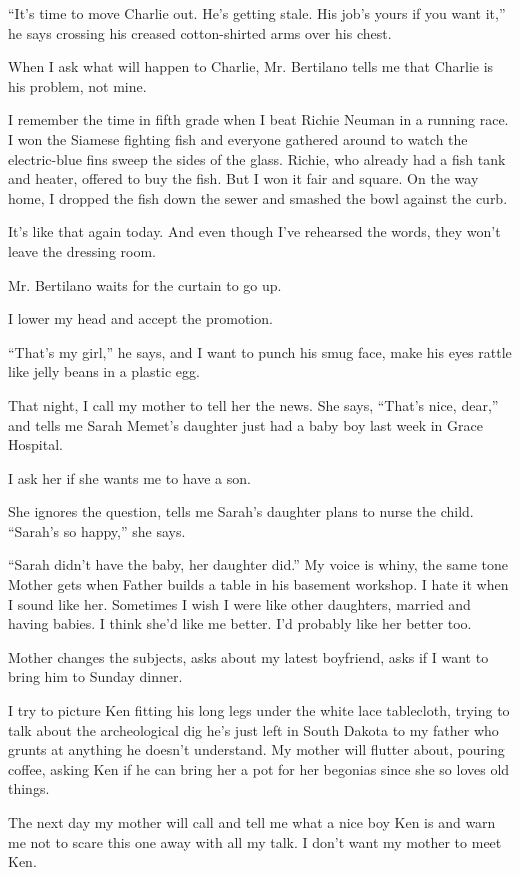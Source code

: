 \documentclass[twoside,10pt]{book}
\begin{document}
``It's time to move Charlie out. He's getting stale. His job's yours if
you want it,'' he says cross­ing his creased cotton-shirted arms over
his chest.

When I ask what will happen to Charlie, Mr. Bertilano tells me that
Charlie is his problem, not mine.

I remember the time in fifth grade when I beat Richie Neuman in a
running race. I won the Siamese fighting fish and everyone gathered
around to watch the electric-blue fins sweep the sides of the glass.
Richie, who already had a fish tank and heater, offered to buy the fish.
But I won it fair and square. On the way home, I dropped the fish down
the sewer and smashed the bowl against the curb.

It's like that again today. And even though I've rehearsed the words,
they won't leave the dressing room.

Mr. Bertilano waits for the curtain to go up.

I lower my head and accept the promotion.

``That's my girl,'' he says, and I want to punch his smug face, make his
eyes rattle like jelly beans in a plastic egg.

That night, I call my mother to tell her the news. She says, ``That's
nice, dear,'' and tells me Sarah Memet's daughter just had a baby boy
last week in Grace Hospital.

I ask her if she wants me to have a son.

She ignores the question, tells me Sarah's daughter plans to nurse the
child. ``Sarah's so happy,'' she says.

``Sarah didn't have the baby, her daughter did.'' My voice is whiny, the
same tone Mother gets when Father builds a table in his basement
workshop. I hate it when I sound like her. Sometimes I wish I were like
other daughters, married and having babies. I think she'd like me
better. I'd probably like her better too.

Mother changes the subjects, asks about my latest boyfriend, asks if I
want to bring him to Sunday dinner.

I try to picture Ken fitting his long legs under the white lace
tablecloth, trying to talk about the archeological dig he's just left in
South Dakota to my father who grunts at anything he doesn't under­stand.
My mother will flutter about, pouring coffee, asking Ken if he can bring
her a pot for her begon­ias since she so loves old things.

The next day my mother will call and tell me what a nice boy Ken is and
warn me not to scare this one away with all my talk. I don't want my
mother to meet Ken.
\end{document}
